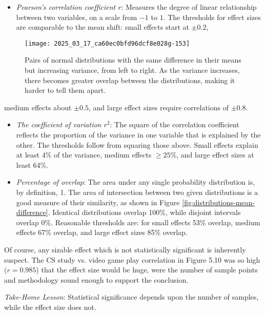 \documentclass[10pt]{article}
\begin{document}
\begin{itemize}
    \item \textit{Pearson's correlation coefficient $r$}: Measures the degree of linear relationship between two variables, on a scale from $-1$ to $1$. The thresholds for effect sizes are comparable to the mean shift: small effects start at $\pm0.2$,
\end{itemize}
\begin{figure}[h]
    \centering
    \texttt{[image: 2025\_03\_17\_ca60ec0bfd96dcf8e028g-153]}
    \caption{Pairs of normal distributions with the same difference in their means but increasing variance, from left to right. As the variance increases, there becomes greater overlap between the distributions, making it harder to tell them apart.}
    \label{fig:distributions-variance}
\end{figure}

medium effects about $\pm0.5$, and large effect sizes require correlations of $\pm0.8$.

\begin{itemize}
    \item \textit{The coefficient of variation $r^{2}$}: The square of the correlation coefficient reflects the proportion of the variance in one variable that is explained by the other. The thresholds follow from squaring those above. Small effects explain at least 4\% of the variance, medium effects $\geq 25\%$, and large effect sizes at least 64\%.
    \item \textit{Percentage of overlap}: The area under any single probability distribution is, by definition, 1. The area of intersection between two given distributions is a good measure of their similarity, as shown in Figure \ref{fig:distributions-mean-difference}. Identical distributions overlap 100\%, while disjoint intervals overlap 0\%. Reasonable thresholds are: for small effects 53\% overlap, medium effects 67\% overlap, and large effect sizes 85\% overlap.
\end{itemize}

Of course, any sizable effect which is not statistically significant is inherently suspect. The CS study vs. video game play correlation in Figure 5.10 was so high ($r=0.985$) that the effect size would be huge, were the number of sample points and methodology sound enough to support the conclusion.

\textit{Take-Home Lesson}: Statistical significance depends upon the number of samples, while the effect size does not.
\end{document}
